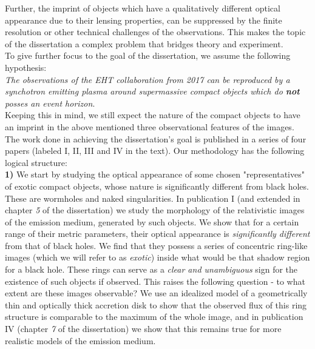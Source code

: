 \documentclass[12pt]{article}
\numberwithin{equation}{section}
\numberwithin{figure}{section}
\begin{document}
	\noindent Further, the imprint of objects which have a qualitatively different optical appearance due to their lensing properties, can be suppressed by the finite resolution or other technical challenges of the observations. This makes the topic of the dissertation a complex problem that bridges theory and experiment.\\
	
	\noindent To give further focus to the goal of the dissertation, we assume the following hypothesis:\\
	
	\emph{The observations of the EHT collaboration from 2017 can be reproduced by a synchotron emitting plasma around supermassive compact objects which do \textbf{not} posses an event horizon}.\\
	
	Keeping this in mind, we still expect the nature of the compact objects to have an imprint in the above mentioned three observational features of the images. The work done in achieving the dissertation's goal is published in a series of four papers (labeled I, II, III and IV in the text). Our methodology has the following logical structure:\\
	
	\textbf{1)} We start by studying the optical appearance of some chosen "representatives" of exotic compact objects, whose nature is significantly different from black holes. These are wormholes and naked singularities. In publication I (and extended in chapter \emph{5} of the dissertation) we study the morphology of the relativistic images of the emission medium, generated by such objects. We show that for a certain range of their metric parameters, their optical appearance is \emph{significantly different} from that of black holes. We find that they possess a series of concentric ring-like images (which we will refer to as \emph{exotic}) inside what would be that shadow region for a black hole. These rings can serve as a \emph{clear and unambiguous} sign for the existence of such objects if observed. This raises the following question - to what extent are these images observable? We use an idealized model of a geometrically thin and optically thick accretion disk \cite{Page1973} to show that the observed flux of this ring structure is comparable to the maximum of the whole image, and in 
	publication IV (chapter \emph{7} of the dissertation) we show that this remains true for more realistic models of the emission medium.\\
	
\end{document}
